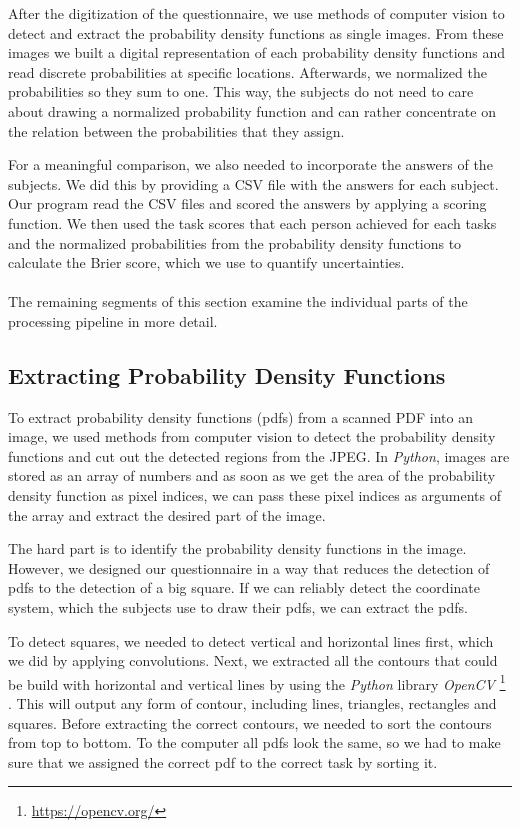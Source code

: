 \documentclass[../main/main.tex]{subfiles}
\begin{document}
	After the digitization of the questionnaire, we use methods of computer vision to detect and extract the probability density functions as single images. From these images we built a digital representation of each probability density functions and read discrete probabilities at specific locations. Afterwards, we normalized the probabilities so they sum to one. This way, the subjects do not need to care about drawing a normalized probability function and can rather concentrate on the relation between the probabilities that they assign.
	
	For a meaningful comparison, we also needed to incorporate the answers of the subjects. We did this by providing a CSV file with the answers for each subject. Our program read the CSV files and scored the answers by applying a scoring function. We then used the task scores that each person achieved for each tasks and the normalized probabilities from the probability density functions to calculate the Brier score, which we use to quantify uncertainties.
	\\\\
	The remaining segments of this section examine the individual parts of the processing pipeline in more detail.
	
	
	\subsection{Extracting Probability Density Functions}
	
	To extract probability density functions (pdfs) from a scanned PDF into an image, we used methods from computer vision to detect the probability density functions and cut out the detected regions from the JPEG. In \textit{Python}, images are stored as an array of numbers and as soon as we get the area of the probability density function as pixel indices, we can pass these pixel indices as arguments of the array and extract the desired part of the image.
	
	The hard part is to identify the probability density functions in the image. However, we designed our questionnaire in a way that reduces the detection of pdfs to the detection of a big square. If we can reliably detect the coordinate system, which the subjects use to draw their pdfs, we can extract the pdfs.
	
	To detect squares, we needed to detect vertical and horizontal lines first, which we did by applying convolutions. Next, we extracted all the contours that could be build with horizontal and vertical lines by using the \textit{Python} library \textit{OpenCV} \footnote{\url{https://opencv.org/}} \citep{bradski2008learning}. This will output any form of contour, including lines, triangles, rectangles and squares. Before extracting the correct contours, we needed to sort the contours from top to bottom. To the computer all pdfs look the same, so we had to make sure that we assigned the correct pdf to the correct task by sorting it. 
	
\end{document}
